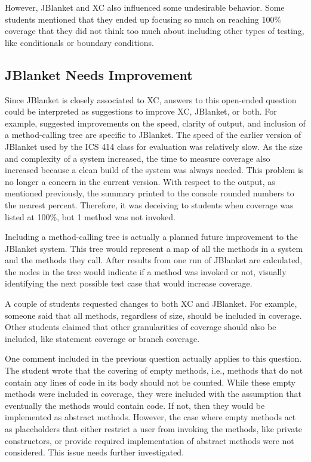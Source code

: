 However, JBlanket and XC also influenced some undesirable behavior.  Some
students mentioned that they ended up focusing so much on reaching 100\%
coverage that they did not think too much about including other types of
testing, like conditionals or boundary conditions.

\subsection{JBlanket Needs Improvement}
Since JBlanket is closely associated to XC, answers to this open-ended
question could be interpreted as suggestions to improve XC, JBlanket, or
both.  For example, suggested improvements on the speed, clarity of output,
and inclusion of a method-calling tree are specific to JBlanket.  The speed
of the earlier version of JBlanket used by the ICS 414 class for evaluation
was relatively slow.  As the size and complexity of a system increased, the
time to measure coverage also increased because a clean build of the system
was always needed.  This problem is no longer a concern in the current
version.  With respect to the output, as mentioned previously, the summary
printed to the console rounded numbers to the nearest percent.  Therefore,
it was deceiving to students when coverage was listed at 100\%, but 1
method was not invoked.

Including a method-calling tree is actually a planned future improvement to
the JBlanket system.  This tree would represent a map of all the methods in
a system and the methods they call.  After results from one run of JBlanket
are calculated, the nodes in the tree would indicate if a method was
invoked or not, visually identifying the next possible test case that would
increase coverage.

A couple of students requested changes to both XC and JBlanket.  For
example, someone said that all methods, regardless of size, should be
included in coverage.  Other students claimed that other granularities of
coverage should also be included, like statement coverage or branch
coverage.

One comment included in the previous question actually applies to this
question.  The student wrote that the covering of empty methods, i.e.,
methods that do not contain any lines of code in its body should not be
counted.  While these empty methods were included in coverage, they were
included with the assumption that eventually the methods would contain
code.  If not, then they would be implemented as abstract methods.
However, the case where empty methods act as placeholders that either
restrict a user from invoking the methods, like private constructors, or
provide required implementation of abstract methods were not considered.
This issue needs further investigated.

